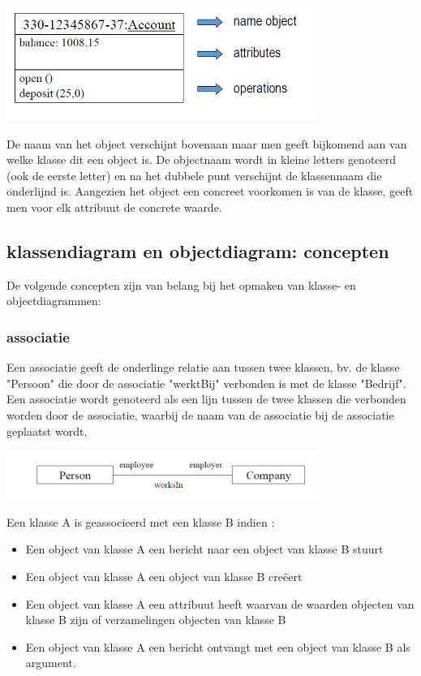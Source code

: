 
\begin{center}
\includegraphics[width=4in]{img/klas2}%
\end{center}

De naam van het object verschijnt bovenaan maar men geeft bijkomend aan van welke klasse dit een object is. De objectnaam wordt in kleine letters genoteerd (ook de eerste letter) en na het dubbele punt verschijnt de klassennaam die onderlijnd is.
Aangezien het object een concreet voorkomen is van de klasse, geeft men voor elk attribuut de concrete waarde.
\newpage
\subsection{klassendiagram en objectdiagram: concepten}

De volgende concepten zijn van belang bij het opmaken van klasse- en objectdiagrammen:

\subsubsection{associatie}

Een associatie geeft de onderlinge relatie aan tussen twee klassen, bv. de klasse "Persoon" die door de associatie "werktBij" verbonden is met de klasse "Bedrijf". Een associatie wordt genoteerd als een lijn tussen de twee klassen die verbonden worden door de associatie, waarbij de naam van de associatie bij de associatie geplaatst wordt.


\begin{center}
\includegraphics[width=4in]{img/ass1}%
\end{center}

Een klasse A is geassocieerd met een klasse B indien :

\begin{itemize}
    \item Een object van klasse A een bericht naar een object van klasse B stuurt
    \item Een object van klasse A een object van klasse B creëert
    \item Een object van klasse A een attribuut heeft waarvan de waarden objecten van klasse B zijn of verzamelingen objecten van klasse B
    \item Een object van klasse A een bericht ontvangt met een object van klasse B als argument.
\end{itemize}

